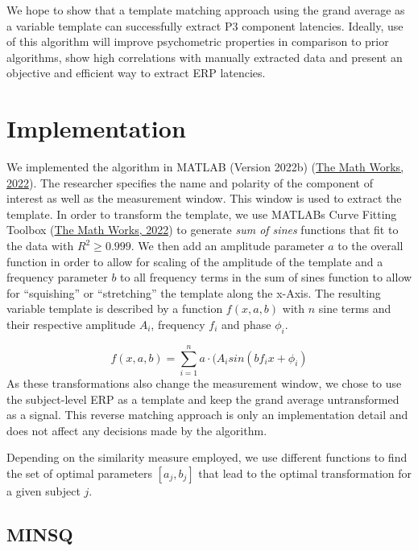 \documentclass[
  man]{apa7}
\begin{document}
We hope to show that a template matching approach using the grand average as a variable template can successfully extract P3 component latencies. Ideally, use of this algorithm will improve psychometric properties in comparison to prior algorithms, show high correlations with manually extracted data and present an objective and efficient way to extract ERP latencies.

\hypertarget{implementation}{%
\section{Implementation}\label{implementation}}

We implemented the algorithm in MATLAB (Version 2022b) (\protect\hyperlink{ref-matlab2022b}{The Math Works, 2022}). The researcher specifies the name and polarity of the component of interest as well as the measurement window. This window is used to extract the template. In order to transform the template, we use MATLABs Curve Fitting Toolbox (\protect\hyperlink{ref-matlab2022b}{The Math Works, 2022}) to generate \emph{sum of sines} functions that fit to the data with \(R^2 \ge 0.999\). We then add an amplitude parameter \(a\) to the overall function in order to allow for scaling of the amplitude of the template and a frequency parameter \(b\) to all frequency terms in the sum of sines function to allow for ``squishing'' or ``stretching'' the template along the x-Axis. The resulting variable template is described by a function \(f(x, a, b)\) with \(n\) sine terms and their respective amplitude \(A_i\), frequency \(f_i\) and phase \(\phi_i\).

\[f(x, a, b) = \sum_{i = 1}^{n} a\cdot(A_isin(bf_ix + \phi_i)\]
As these transformations also change the measurement window, we chose to use the subject-level ERP as a template and keep the grand average untransformed as a signal. This reverse matching approach is only an implementation detail and does not affect any decisions made by the algorithm.

Depending on the similarity measure employed, we use different functions to find the set of optimal parameters \([a_j, b_j]\) that lead to the optimal transformation for a given subject \(j\).

\hypertarget{minsq}{%
\subsection{MINSQ}\label{minsq}}
\end{document}
